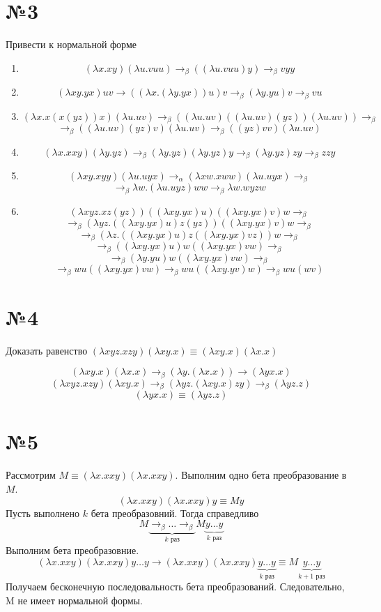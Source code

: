 \documentclass[a4paper,14pt]{scrreprt}
\newcommand{\lmd}{\lambda}
\begin{document}
\section*{№3}
Привести к нормальной форме
\begin{enumerate}
	\item 
		$$(\lmd x.xy)(\lmd u.vuu) \to_\beta ((\lmd u.vuu)y) \to_\beta vyy $$
	\item 
		$$ (\lmd xy.yx)uv \to ((\lmd x.(\lmd y.yx))u)v \to_\beta (\lmd y.yu)v \to_\beta  vu $$
	\item 
		$$ (\lmd x.x(x(yz))x)(\lmd u.uv) \to_\beta ((\lmd u.uv)((\lmd u.uv)(yz))(\lmd u.uv)) \to_\beta $$ 
		$$ \to_\beta ((\lmd u.uv)(yz)v)(\lmd u.uv) \to_\beta ((yz)vv)(\lmd u.uv)$$
	\item 
		$$ (\lmd x.xxy)(\lmd y.yz) \to_\beta (\lmd y.yz)(\lmd y.yz)y \to_\beta (\lmd y.yz)zy \to_\beta zzy $$
	\item 
		$$ (\lmd xy.xyy)(\lmd u.uyx) \to_\alpha (\lmd xw.xww)(\lmd u.uyx) \to_\beta $$
		$$ \to_\beta \lmd w.(\lmd u.uyz)ww \to_\beta \lmd w.wyzw $$
	\item 
		$$ (\lmd xyz.xz(yz))((\lmd xy.yx)u)((\lmd xy.yx)v)w \to_\beta $$
		$$ \to_\beta (\lmd yz.((\lmd xy.yx)u)z(yz))((\lmd xy.yx)v)w \to_\beta $$
		$$ \to_\beta  (\lmd z.((\lmd xy.yx)u)z((\lmd xy.yx)vz))w \to_\beta $$
		$$ \to_\beta  ((\lmd xy.yx)u)w((\lmd xy.yx)vw) \to_\beta $$
		$$ \to_\beta  (\lmd y.yu)w((\lmd xy.yx)vw) \to_\beta $$
		$$ \to_\beta wu((\lmd xy.yx)vw) \to_\beta wu((\lmd xy.yv)w) \to_\beta wu(wv)$$
\end{enumerate}

\section*{№4}
Доказать равенство $ (\lmd xyz.xzy)(\lmd xy.x) \equiv (\lmd xy.x)(\lmd x.x) $

$$ (\lmd xy.x)(\lmd x.x )\to_\beta (\lmd y.(\lmd x.x)) \to (\lmd yx.x) $$
$$ (\lmd xyz.xzy)(\lmd xy.x) \to_\beta (\lmd yz.(\lmd xy.x)zy) \to_\beta (\lmd yz.z) $$
$$ (\lmd yx.x) \equiv (\lmd yz.z)$$

\section*{№5}
Рассмотрим $M \equiv (\lmd x.xxy)(\lmd x.xxy)$. 
Выполним одно бета преобразование в $ M$.
$$ (\lmd x.xxy)(\lmd x.xxy)y \equiv My $$
Пусть выполнено $ k$ бета преобразовний. Тогда справедливо 
$$ M \underbrace{\to_\beta \dots \to_\beta}_{k \text{ раз}} M\underbrace{y \dots y}_{k \text{ раз}} $$
Выполним бета преобразовние.
$$ (\lmd x.xxy)(\lmd x.xxy)y \dots y \to (\lmd x.xxy)(\lmd x.xxy)\underbrace{y \dots y}_{k \text{ раз}} \equiv   M\underbrace{y \dots y}_{k+1 \text{ раз}}$$
Получаем бесконечную последовальность бета преобразований. Следовательно, M не имеет нормальной формы.
\end{document}
